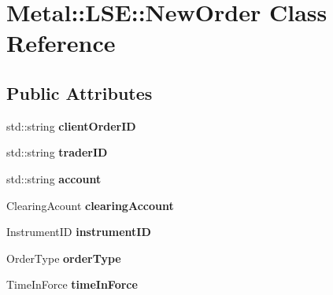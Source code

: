 \hypertarget{classMetal_1_1LSE_1_1NewOrder}{}\section{Metal\+:\+:L\+S\+E\+:\+:New\+Order Class Reference}
\label{classMetal_1_1LSE_1_1NewOrder}
\subsection*{Public Attributes}
\begin{DoxyCompactItemize}
\item 
\hypertarget{classMetal_1_1LSE_1_1NewOrder_a53ce2b8f89f168c58fa2a8f97ce79c93}{}std\+::string {\bfseries client\+Order\+I\+D}\label{classMetal_1_1LSE_1_1NewOrder_a53ce2b8f89f168c58fa2a8f97ce79c93}

\item 
\hypertarget{classMetal_1_1LSE_1_1NewOrder_aff72605e8542180dad099904873bda84}{}std\+::string {\bfseries trader\+I\+D}\label{classMetal_1_1LSE_1_1NewOrder_aff72605e8542180dad099904873bda84}

\item 
\hypertarget{classMetal_1_1LSE_1_1NewOrder_a80ad2239737f52a61a27eb4f6193bdba}{}std\+::string {\bfseries account}\label{classMetal_1_1LSE_1_1NewOrder_a80ad2239737f52a61a27eb4f6193bdba}

\item 
\hypertarget{classMetal_1_1LSE_1_1NewOrder_a65522450bdc6e5ac29e739738bbba34e}{}Clearing\+Acount {\bfseries clearing\+Account}\label{classMetal_1_1LSE_1_1NewOrder_a65522450bdc6e5ac29e739738bbba34e}

\item 
\hypertarget{classMetal_1_1LSE_1_1NewOrder_aeffc76c3cb37c6bd7f6e2a9c5fa4d441}{}Instrument\+I\+D {\bfseries instrument\+I\+D}\label{classMetal_1_1LSE_1_1NewOrder_aeffc76c3cb37c6bd7f6e2a9c5fa4d441}

\item 
\hypertarget{classMetal_1_1LSE_1_1NewOrder_aca679f638141bbae5505ed8bb6961378}{}Order\+Type {\bfseries order\+Type}\label{classMetal_1_1LSE_1_1NewOrder_aca679f638141bbae5505ed8bb6961378}

\item 
\hypertarget{classMetal_1_1LSE_1_1NewOrder_ab0da192ab665eeffa7797f901d2f94fc}{}Time\+In\+Force {\bfseries time\+In\+Force}\label{classMetal_1_1LSE_1_1NewOrder_ab0da192ab665eeffa7797f901d2f94fc}


\end{DoxyCompactItemize}
